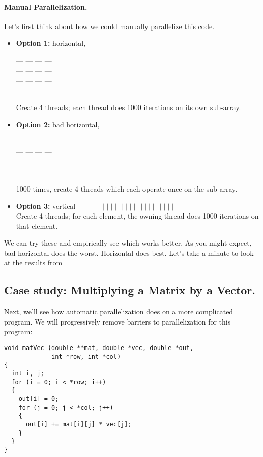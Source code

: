 \paragraph{Manual Parallelization.} Let's first think about how we could 
manually parallelize this code.
\begin{itemize}
\item {\bf Option 1:} horizontal, \begin{minipage}{7em} --- --- --- ---\\[-.8em] --- --- --- ---\\[-.8em] --- --- --- --- \end{minipage} \\
Create 4 threads; each thread does 1000 iterations on its own sub-array.

\item {\bf Option 2:} bad horizontal, \begin{minipage}{7em} --- --- --- ---\\[-.8em] --- --- --- ---\\[-.8em] --- --- --- --- \end{minipage} \\
1000 times, create 4 threads which each operate once on the sub-array.

\item {\bf Option 3:} vertical $ \quad \: \qquad \mid \mid \mid\mid \:\: \mid \mid \mid \mid \:\: \mid \mid \mid \mid\:\: \mid \mid \mid \mid$\\
Create 4 threads; for each element, the owning thread does 1000 iterations on that element.
\end{itemize}
We can try these and empirically see which works better. As you might expect, bad horizontal
does the worst. Horizontal does best. Let's take a minute to look at the results from~\cite{autopar:related}
\subsection*{Case study: Multiplying a Matrix by a Vector.}
Next, we'll see how automatic parallelization does on a more complicated
program. We will progressively remove barriers to parallelization for
this program:

\begin{verbatim}
void matVec (double **mat, double *vec, double *out,
             int *row, int *col) 
{
  int i, j;
  for (i = 0; i < *row; i++)
  {
    out[i] = 0;
    for (j = 0; j < *col; j++)
    {
      out[i] += mat[i][j] * vec[j];
    }
  }
}
\end{verbatim}

